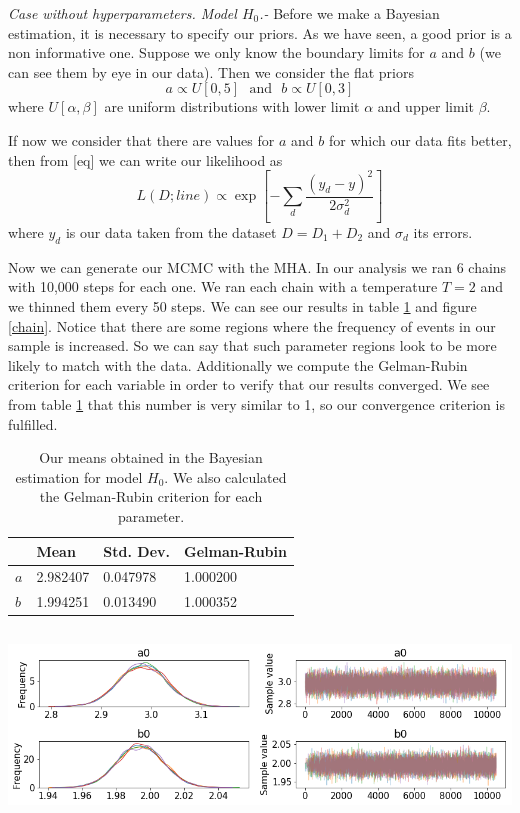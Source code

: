 \documentclass[onecolumn,           %
               showpacs,            %
               preprintnumbers,     %
               aps,                 %
               letterpaper,             %
               superscriptaddress,      %
               nofootinbib,         %
               tightenlines,        %
               floats,floatfix      %
               ,usenatbib,
               ]{revtex4-1}
\begin{document}
\textit{Case without hyperparameters. Model $H_0$.-} Before we make a Bayesian estimation, it is necessary to specify our priors. As we have seen, a good prior is a non informative one. Suppose we only know the boundary limits for $a$ and $b$ (we can see them by eye in our data). Then we consider the flat priors
\begin{equation}
a \propto U[0,5] \ \ \ \text{and} \ \ \ b \propto U[0,3]
\end{equation}
where $U[\alpha,\beta]$ are uniform distributions with lower limit $\alpha$ and upper limit $\beta$.

If now we consider that there are values for $a$ and $b$ for which our data fits better, then from [eq] we can write our likelihood as
\begin{equation}
L(D;line)\propto \exp\left[-\sum_d \frac{(y_d-y)^2}{2\sigma_d^2}\right]
\end{equation}
where $y_d$ is our data taken from the dataset $D=D_1+D_2$ and $\sigma_d$ its errors.

Now we can generate our MCMC with the MHA. In our analysis we ran 6 chains with 10,000 steps for each one. We ran each chain with a temperature $T=2$ and we thinned them every 50 steps. We can see our results in table \ref{tabla1} and figure \ref{chain}. Notice that there are some regions where the frequency of events in our sample is increased. So we can say that such parameter regions look to be more likely to match with the data. Additionally we compute the Gelman-Rubin criterion for each variable in order to verify that our results converged. We see from table \ref{tabla1} that this number is very similar to 1, so our convergence criterion is fulfilled.

\begin{table}[h!]
\centering
\begin{tabular}{||l|l|l|l||} 
 \hline
 & \textbf{Mean} & \textbf{Std. Dev.} & \textbf{Gelman-Rubin} \\ [0.5ex] 
 \hline\hline
$a$ & 2.982407 & 0.047978 & 1.000200 \\
\hline
$b$ & 1.994251 & 0.013490 & 1.000352\\ [1ex] 
 \hline
\end{tabular}
\caption{\footnotesize{Our means obtained in the Bayesian estimation for model $H_0$. We also calculated the Gelman-Rubin criterion for each parameter.}}
\label{tabla1}
\end{table}

\begin{minipage}{\textwidth}
\centering
\includegraphics[height=5cm]{Figures/chain_new.png}
\label{chain}
\end{minipage}
\end{document}
